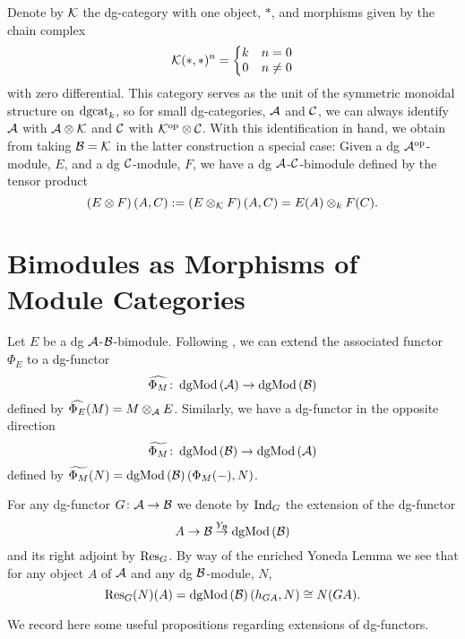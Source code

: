 \begin{remark}\label{rem: tensor over k}
  Denote by \(\mathcal{K}\) the dg-category with one object, \(\ast\), and morphisms given by the chain complex
  \[\mathcal{K}(\ast,\ast)^n =
  \left\{ \begin{matrix}
    k & n = 0\\
    0 & n \neq 0
  \end{matrix}\right.\]  with zero differential.
  This category serves as the unit of the symmetric monoidal structure on \(\operatorname{dgcat}_k\), so for small dg-categories, \(\mathcal{A}\) and \(\mathcal{C}\), we can always identify \(\mathcal{A}\) with \(\mathcal{A} \otimes \mathcal{K}\) and \(\mathcal{C}\) with \(\mathcal{K}^{\operatorname{op}} \otimes \mathcal{C}\).
  With this identification in hand, we obtain from taking \(\mathcal{B} = \mathcal{K}\) in the latter construction a special case:
  Given a dg \(\mathcal{A}^{\operatorname{op}}\)-module, \(E\), and a dg \(\mathcal{C}\)-module, \(F\), we have a dg \(\mathcal{A}\)-\(\mathcal{C}\)-bimodule defined by the tensor product
  \[\left(E \otimes F\right)(A,C) := \left(E \otimes_{\mathcal{K}} F\right)(A,C) = E(A) \otimes_k F(C).\]
\end{remark}

\section{Bimodules as Morphisms of Module Categories}
Let \(E\) be a dg \(\mathcal{A}\)-\(\mathcal{B}\)-bimodule.
Following \cite[Section 3]{CS15}, we can extend the associated functor \(\Phi_E\) to a dg-functor
\[\widehat{\Phi_M} \colon \operatorname{dgMod}\left(\mathcal{A}\right) \to \operatorname{dgMod}\left(\mathcal{B}\right)\]
defined by \(\widehat{\Phi_E}(M) = M \otimes_{\mathcal{A}} E\).
Similarly, we have a dg-functor in the opposite direction
\[\widetilde{\Phi_M} \colon \operatorname{dgMod}\left(\mathcal{B}\right) \to \operatorname{dgMod}\left(\mathcal{A}\right)\]
defined by \(\widetilde{\Phi_M}(N) = \operatorname{dgMod}\left(\mathcal{B}\right)(\Phi_M( - ), N)\).

For any dg-functor \(G \colon \mathcal{A} \to \mathcal{B}\) we denote by \(\operatorname{Ind}_{G}\) the extension of the dg-functor
\[A \to \mathcal{B} \overset{Y_{\mathcal{B}}}\to \operatorname{dgMod}\left(\mathcal{B}\right)\]
and its right adjoint by \(\operatorname{Res}_{G}\).
By way of the enriched Yoneda Lemma we see that for any object \(A\) of \(\mathcal{A}\) and any dg \(\mathcal{B}\)-module, \(N\), 
\[\operatorname{Res}_{G}(N)(A) = \operatorname{dgMod}\left(\mathcal{B}\right)(h_{GA}, N) \cong N(GA).\]

We record here some useful propositions regarding extensions of dg-functors.

